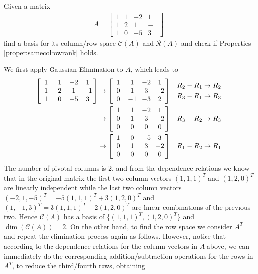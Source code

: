 \begin{exmp}
\label{exmp:colrowspace}
Given a matrix
\begin{align*}
A = 
\begin{bmatrix}
1 & 1 & -2 & 1 \\
1 & 2 & 1 & -1 \\
1 & 0 & -5 & 3
\end{bmatrix}
\end{align*}
find a basis for its column/row space $\mathcal{C}(A)$ and $\mathcal{R}(A)$ and check if Properties \ref{proper:samecolrowrank} holds.
\end{exmp}
\begin{solution}
We first apply Gaussian Elimination to $A$, which leads to
\begin{align*}
\left[\begin{array}{@{\;}wc{10pt}wc{10pt}wc{10pt}wc{10pt}@{\;}}
1 & 1 & -2 & 1 \\
1 & 2 & 1 & -1 \\
1 & 0 & -5 & 3
\end{array}\right]
& \rightarrow
\left[\begin{array}{@{\;}wc{10pt}wc{10pt}wc{10pt}wc{10pt}@{\;}}
1 & 1 & -2 & 1 \\
0 & 1 & 3 & -2 \\
0 & -1 & -3 & 2
\end{array}\right]
& \begin{aligned}
R_2 - R_1 &\to R_2 \\
R_3 - R_1 &\to R_3
\end{aligned} \\
& \rightarrow
\left[\begin{array}{@{\;}wc{10pt}wc{10pt}wc{10pt}wc{10pt}@{\;}}
1 & 1 & -2 & 1 \\
0 & 1 & 3 & -2 \\
0 & 0 & 0 & 0
\end{array}\right]
& R_3 - R_2 \to R_3 \\
& \rightarrow
\left[\begin{array}{@{\;}wc{10pt}wc{10pt}wc{10pt}wc{10pt}@{\;}}
1 & 0 & -5 & 3 \\
0 & 1 & 3 & -2 \\
0 & 0 & 0 & 0
\end{array}\right]
& R_1 - R_2 \to R_1
\end{align*}
The number of pivotal columns is $2$, and from the dependence relations we know that in the original matrix the first two column vectors $(1,1,1)^T$ and $(1,2,0)^T$ are linearly independent while the last two column vectors $(-2,1,-5)^T = -5(1,1,1)^T + 3(1,2,0)^T$ and $(1,-1,3)^T = 3(1,1,1)^T - 2(1,2,0)^T$ are linear combinations of the previous two. Hence $\mathcal{C}(A)$ has a basis of $\{(1,1,1)^T, (1,2,0)^T\}$ and $\dim(\mathcal{C}(A)) = 2$. On the other hand, to find the row space we consider $A^T$ and repeat the elimination process again as follows. However, notice that according to the dependence relations for the column vectors in $A$ above, we can immediately do the corresponding addition/subtraction operations for the rows in $A^T$, to reduce the third/fourth rows, obtaining

\end{solution}
